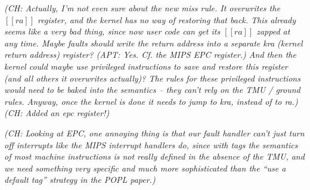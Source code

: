 \documentclass{article}
\newcommand{\ch}[1]{{\color{dkblue}\em (CH: #1)}}
\newcommand{\apt}[1]{{\color{red}\em (APT: #1)}}
\begin{document}
\ch{Actually, I'm not even sure about the new miss rule. It overwrites
  the $[[ra]]$ register, and the kernel has no way of restoring that
  back.  This already seems like a very bad thing, since now user code
  can get its $[[ra]]$ zapped at any time. Maybe faults should write
  the return address into a separate kra (kernel return address)
  register? \apt{Yes. Cf. the MIPS EPC register.} 
  And then the kernel could maybe use privileged
  instructions to save and restore this register (and all others it
  overwrites actually)? The rules for these privileged instructions
  would need to be baked into the semantics -- they can't rely on the
  TMU / ground rules. Anyway, once the kernel is done it needs to jump
  to kra, instead of to ra.}\ch{Added an epc register!}

\ch{Looking at EPC, one annoying thing is that our fault handler can't
  just turn off interrupts like the MIPS interrupt handlers do, since
  with tags the semantics of most machine instructions is not really
  defined in the absence of the TMU, and we need something very
  specific and much more sophisticated than the ``use a default tag''
  strategy in the POPL paper.}

\ottusedrule{\ottdruleStepXXKJEPC{}}
\end{document}

